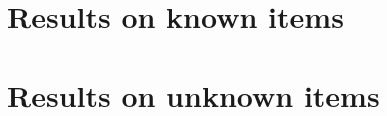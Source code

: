 \section{Results on known items}\label{sec:apIoUresults}
\begin{figure}[h]
 \centering 
 
\end{figure}

\clearpage
\section{Results on unknown items}\label{sec:apIoUunknownresults}
\begin{figure}[h]
 \centering 
 
\end{figure}

\clearpage
